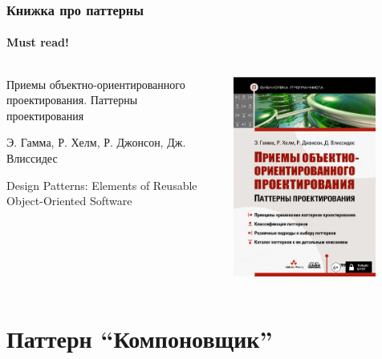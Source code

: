 \documentclass[xetex,mathserif,serif]{beamer}
\begin{document}
    \begin{frame}
        \frametitle{Книжка про паттерны}
        \framesubtitle{Must read!}

        \begin{columns}
            \begin{column}{0.6\textwidth}
                Приемы объектно-ориентированного проектирования. Паттерны проектирования

                Э. Гамма, Р. Хелм, Р. Джонсон, Дж. Влиссидес

                Design Patterns: Elements of Reusable Object-Oriented Software
            \end{column}
            \begin{column}{0.4\textwidth}
                \begin{center}
                    \includegraphics[width=0.8\textwidth]{patternBookCover.png}
                \end{center}
            \end{column}
        \end{columns}
    \end{frame}

    \section{Паттерн ``Компоновщик''}
\end{document}
